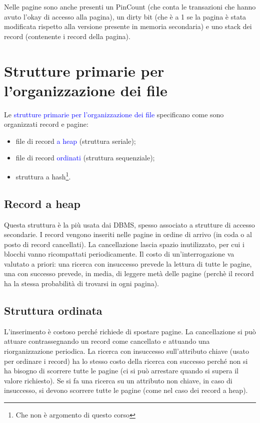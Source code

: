 Nelle pagine sono anche presenti un PinCount (che conta le transazioni che hanno avuto l'okay di accesso alla pagina), un dirty bit (che è a 1 se la pagina è stata modificata rispetto alla versione presente in memoria secondaria) e uno stack dei record (contenente i record della pagina).

\section{Strutture primarie per l’organizzazione dei file}

Le \textcolor{blue}{strutture primarie per l’organizzazione dei file} specificano come sono organizzati record e pagine:
\begin{itemize}
    \item file di record \textcolor{blue}{a heap} (struttura seriale);
    \item file di record \textcolor{blue}{ordinati} (struttura sequenziale);
    \item struttura a hash\footnote{Che non è argomento di questo corso}.
\end{itemize}

\subsection{Record a heap}

Questa struttura è la più usata dai DBMS, spesso associato a strutture di accesso secondarie. I record vengono inseriti nelle pagine in ordine di arrivo (in coda o al posto di record cancellati). La cancellazione lascia spazio inutilizzato, per cui i blocchi vanno ricompattati periodicamente. Il costo di un'interrogazione va valutato a priori: una ricerca con insuccesso prevede la lettura di tutte le pagine, una con successo prevede, in media, di leggere metà delle pagine (perchè il record ha la stessa probabilità di trovarsi in ogni pagina). 

\subsection{Struttura ordinata}

L’inserimento è costoso perché richiede di spostare pagine. La cancellazione si può attuare contrassegnando un record come
cancellato e attuando una riorganizzazione periodica. La ricerca con insuccesso sull’attributo chiave (usato per ordinare i record) ha lo stesso costo della ricerca con successo perché non si ha bisogno di scorrere tutte le pagine (ci si può arrestare quando si supera il valore richiesto). Se si fa una ricerca su un attributo non chiave, in caso di insuccesso, si devono scorrere tutte le pagine (come nel caso dei record a heap).

